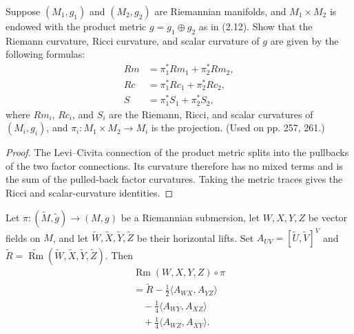 \begin{exercise}
\label{prob:product-metric-curvature}
Suppose $(M_1, g_1)$ and $(M_2, g_2)$ are Riemannian manifolds, and $M_1 \times M_2$ is endowed with the product metric $g = g_1 \oplus g_2$ as in (2.12). Show that the Riemann curvature, Ricci curvature, and scalar curvature of $g$ are given by the following formulas:
\begin{align*}
Rm &= \pi_1^* Rm_1 + \pi_2^* Rm_2, \\
Rc &= \pi_1^* Rc_1 + \pi_2^* Rc_2, \\
S &= \pi_1^* S_1 + \pi_2^* S_2,
\end{align*}
where $Rm_i$, $Rc_i$, and $S_i$ are the Riemann, Ricci, and scalar curvatures of $(M_i, g_i)$, and $\pi_i : M_1 \times M_2 \to M_i$ is the projection. (Used on pp. 257, 261.)
\end{exercise}

\begin{proof}
\sketch
The Levi--Civita connection of the product metric splits into the pullbacks of
the two factor connections. Its curvature therefore has no mixed terms and
is the sum of the pulled-back factor curvatures. Taking the metric traces gives
the Ricci and scalar-curvature identities.
\end{proof}

\begin{proposition}
\label{prop:oneill-formula}
Let $\pi:(\widetilde M,\widetilde g)\to(M,g)$ be a Riemannian submersion,
let $W,X,Y,Z$ be vector fields on $M$, and let
$\widetilde W,\widetilde X,\widetilde Y,\widetilde Z$ be their horizontal
lifts. Set
$A_{UV}=[\widetilde U,\widetilde V]^V$ and
$\widetilde R=\widetilde{\operatorname{Rm}}(
\widetilde W,\widetilde X,\widetilde Y,\widetilde Z)$. Then
\[
\begin{gathered}
\operatorname{Rm}(W,X,Y,Z)\circ\pi\\
=\widetilde R-\frac12\langle A_{WX},A_{YZ}\rangle\\
\quad-\frac14\langle A_{WY},A_{XZ}\rangle\\
\quad+\frac14\langle A_{WZ},A_{XY}\rangle.
\end{gathered}
\]
\end{proposition}

